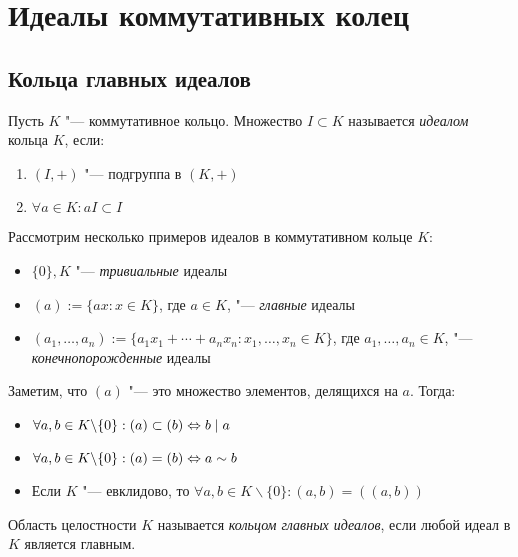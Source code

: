\section{Идеалы коммутативных колец}

\subsection{Кольца главных идеалов}

\begin{definition}
	Пусть $K$ "--- коммутативное кольцо. Множество $I \subset K$ называется \textit{идеалом} кольца $K$, если:
	\begin{enumerate}
		\item $(I, +)$ "--- подгруппа в $(K, +)$
		\item $\forall a \in K: aI \subset I$
	\end{enumerate}
\end{definition}

\begin{example}
	Рассмотрим несколько примеров идеалов в коммутативном кольце $K$:
	\begin{itemize}
		\item $\{0\}, K$ "--- \textit{тривиальные} идеалы
		\item $(a) := \{ax : x \in K\}$, где $a \in K$, "--- \textit{главные} идеалы
		\item $(a_1, \dotsc, a_n) := \{a_1x_1 + \dotsb + a_nx_n : x_1, \dotsc, x_n \in K\}$, где $a_1, \dotsc, a_n \in K$, "--- \textit{конечнопорожденные} идеалы
	\end{itemize}
\end{example}

\begin{note}
	Заметим, что $(a)$ "--- это множество элементов, делящихся на $a$. Тогда:
	\begin{itemize}
		\item $\forall a, b \in K \backslash \{0\}: (a) \subset (b) \Leftrightarrow b \mid a$
		\item $\forall a, b \in K \backslash \{0\}: (a) = (b) \Leftrightarrow a \sim b$
		\item Если $K$ "--- евклидово, то $\forall a, b \in K \backslash \{0\}: (a, b) = ((a, b))$
	\end{itemize}
\end{note}

\begin{definition}
	Область целостности $K$ называется \textit{кольцом главных идеалов}, если любой идеал в $K$ является главным.
\end{definition}

